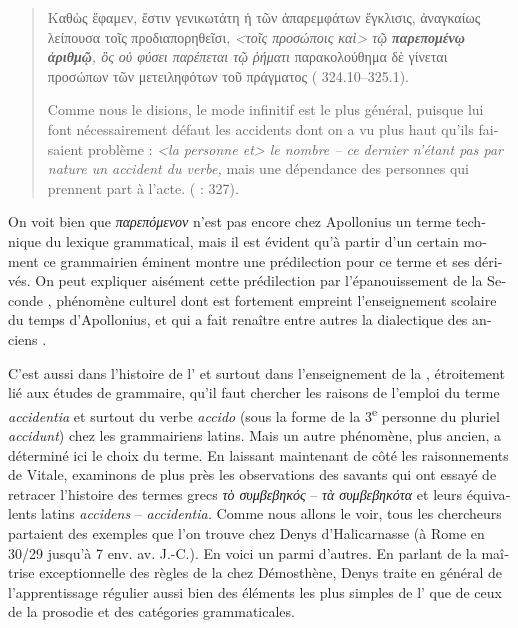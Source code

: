 \documentclass[output=paper]{langsci/langscibook}
\begin{document}
\begin{otherlanguage}{french}
\begin{quote}
    Καθὼς ἔφαμεν, ἔστιν γενικωτάτη ἡ τῶν ἀπαρεμφάτων ἔγκλισις, ἀναγκαίως λείπουσα τοῖς προδιαπορηθεῖσι, \textit{<τοῖς προσώποις καὶ> τῷ {\textbf{{παρεπομένῳ ἀριθμῷ}}, ὃς οὐ φύσει παρέπεται τῷ ῥήματι}} παρακολούθημα δὲ γίνεται προσώπων τῶν μετειληφότων τοῦ πράγματος ( 324.10--325.1).
    
    Comme nous le disions, le mode infinitif est le plus général, puisque lui font nécessairement défaut les accidents dont on a vu plus haut qu’ils faisaient problème : \textit{<la personne et> le nombre – ce dernier n’étant pas par nature un accident du verbe,} mais une dépendance des personnes qui prennent part à l’acte. (\citealt{lallot_apollonius_1997} : 327).

\end{quote}

On voit bien que \textit{παρεπόμενον} n’est pas encore chez Apollonius un terme technique du lexique grammatical, mais il est évident qu’à partir d’un certain moment ce grammairien éminent montre une prédilection pour ce terme et ses dérivés. On peut expliquer aisément cette prédilection par l’épanouissement de la Seconde , phénomène culturel dont est fortement empreint l’enseignement scolaire du temps d’Apollonius, et qui a fait renaître entre autres la dialectique des anciens . 

C’est aussi dans l’histoire de l’ et surtout dans l’enseignement de la , étroitement lié aux études de grammaire, qu’il faut chercher les raisons de l’emploi du terme \textit{accidentia} et surtout du verbe \textit{accido} (sous la forme de la 3\textsuperscript{e} personne du pluriel \textit{accidunt}) chez les grammairiens latins. Mais un autre phénomène, plus ancien, a déterminé ici le choix du terme. En laissant maintenant de côté les raisonnements de Vitale, examinons de plus près les observations des savants qui ont essayé de retracer l’histoire des termes grecs \textit{τὸ συμβεβηκός} – \textit{τὰ συμβεβηκότα} et leurs équivalents latins \textit{accidens} – \textit{accidentia.} Comme nous allons le voir, tous les chercheurs partaient des exemples que l’on trouve chez Denys d’Halicarnasse (à Rome en 30/29 jusqu’à 7 env. av. J.-C.). En voici un parmi d’autres. En parlant de la maîtrise exceptionnelle des règles de la  chez Démosthène, Denys traite en général de l’apprentissage régulier aussi bien des éléments les plus simples de l’ que de ceux de la prosodie et des catégories grammaticales. 


\end{otherlanguage}
\end{document}
